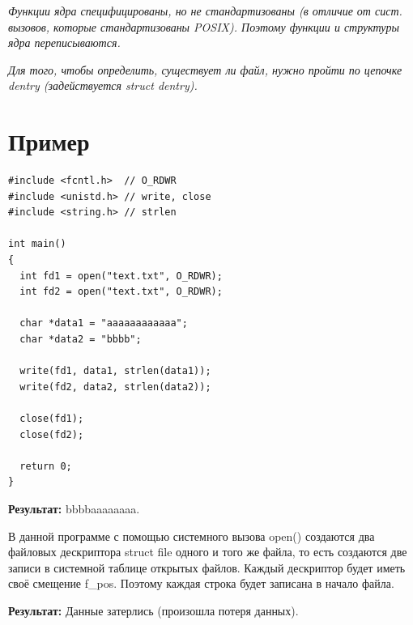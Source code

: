\textit{
Функции ядра специфицированы, но не стандартизованы (в отличие от сист. вызовов, которые стандартизованы POSIX). Поэтому функции и структуры ядра переписываются.}

\textit{
Для того, чтобы определить, существует ли файл, нужно пройти по цепочке dentry (задействуется struct dentry).}

\section{Пример}
\begin{lstlisting}
#include <fcntl.h>  // O_RDWR
#include <unistd.h> // write, close
#include <string.h> // strlen

int main()
{
  int fd1 = open("text.txt", O_RDWR);
  int fd2 = open("text.txt", O_RDWR);

  char *data1 = "aaaaaaaaaaaa";
  char *data2 = "bbbb";

  write(fd1, data1, strlen(data1));
  write(fd2, data2, strlen(data2));

  close(fd1);
  close(fd2);

  return 0;
}
\end{lstlisting}

\textbf{Результат:} bbbbaaaaaaaa.

В данной программе с помощью системного вызова open() создаются два файловых дескриптора struct file одного и того же файла, то есть создаются две записи в системной таблице открытых файлов. Каждый дескриптор будет иметь своё смещение f\_pos. Поэтому каждая строка будет записана в начало файла.

\textbf{Результат:} Данные затерлись (произошла потеря данных).


